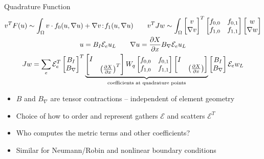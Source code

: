 \documentclass[aspectratio=1610]{beamer}
\begin{document}
\begin{frame}{Quadrature Function}
  \begin{gather*}
    v^T F(u) \sim \int_\Omega v \cdot f_0(u, \nabla u) + \nabla v \!:\! f_1(u, \nabla u) \qquad
    v^T J w \sim \int_\Omega \begin{bmatrix} v \\ \nabla v \end{bmatrix}^T \begin{bmatrix} f_{0,0} & f_{0,1} \\ f_{1,0} & f_{1,1} \end{bmatrix} \begin{bmatrix} w \\ \nabla w \end{bmatrix} \\
    u = B_I \mathcal E_e u_L \qquad \nabla u = \frac{\partial X}{\partial x} B_{\nabla} \mathcal E_e u_L \\
    J w = \sum_e \mathcal E_e^T \begin{bmatrix} B_I \\ B_{\nabla} \end{bmatrix}^T
    \underbrace{\begin{bmatrix} I & \\ & \left( \frac{\partial X}{\partial x}\right)^T \end{bmatrix} W_q \begin{bmatrix} f_{0,0} & f_{0,1} \\ f_{1,0} & f_{1,1} \end{bmatrix} \begin{bmatrix} I & \\ & \left( \frac{\partial X}{\partial x}\right) \end{bmatrix}}_{\text{coefficients at quadrature points}} \begin{bmatrix} B_I \\ B_{\nabla} \end{bmatrix} \mathcal E_e w_L
  \end{gather*}
  \begin{itemize}
  \item $B$ and $B_\nabla$ are tensor contractions -- independent of element geometry
  \item Choice of how to order and represent gathers $\mathcal E$ and scatters $\mathcal E^T$
  \item Who computes the metric terms and other coefficients?
  \item Similar for Neumann/Robin and nonlinear boundary conditions
  \end{itemize}
\end{frame}
\end{document}
